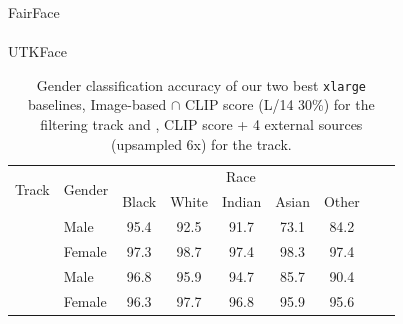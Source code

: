 \begin{table}

\renewcommand{\arraystretch}{1.1}
\caption{Gender classification accuracy of our two best {\small\texttt{xlarge}} baselines, Image-based $\cap$ CLIP score (L/14 30\%) for the filtering track and \pool, CLIP score + 4 external sources (upsampled 6x) for the \byod track.}
\setlength\tabcolsep{4pt}

\small
\centering
FairFace
\\
\\
\vspace{10pt}
UTKFace
\\

\renewcommand{\arraystretch}{1.1}
\begin{tabular}{llccccccc}
\toprule
\multirow{2}{*}{Track} & \multirow{2}{*}{Gender} & \multicolumn{5}{c}{Race} \\
& & Black & White & Indian & Asian & Other \\
\midrule
\cellcolor{white}  & Male & 95.4 & 92.5 & 91.7 & 73.1 & 84.2 \\
\cellcolor{white} \multirow{-2}{*}{Filtering}& Female & 97.3 & 98.7 & 97.4 & 98.3 & 97.4 \\
\midrule
\cellcolor{white}  & Male & 96.8 & 95.9 & 94.7 & 85.7 & 90.4 \\
\cellcolor{white} \multirow{-2}{*}{\byod}& Female & 96.3 & 97.7 & 96.8 & 95.9 & 95.6 \\
\bottomrule
\end{tabular}
\label{tab:app_fairness_intersection}
\end{table}

